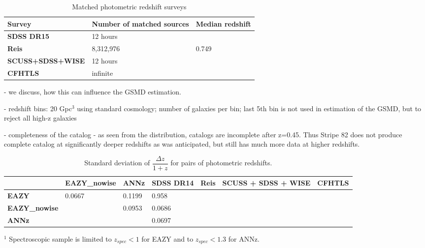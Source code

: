 \documentclass[apj,iop]{emulateapj}
\begin{document}
\begin{table}
    \caption{Matched photometric redshift surveys}
\begin{tabular}{|p{3.3cm}|p{2.4cm}|p{1.3cm}|}    
        \hline
        Survey                 & Number of matched sources & Median redshift    \\
        \hline
        \textbf{SDSS DR15}  & 12 hours & \\
        \textbf{Reis}     & 8,312,976  & 0.749    \\
        \textbf{SCUSS+SDSS+WISE} & 12 hours & \\
        \textbf{CFHTLS}         & infinite &\\
        \hline
    \end{tabular}
    \label{table:photoz_matched}
\end{table}

- we discuss, how this can influence the GSMD estimation.

- redshift bins: 20 Gpc$^3$ using standard cosmology; number of galaxies per bin; last 5th bin is not used in estimation of the GSMD, but to reject all high-z galaxies

- completeness of the catalog - as seen from the distribution, catalogs are incomplete after z=0.45. Thus Stripe 82 does not produce complete catalog at significantly deeper redshifts as was anticipated, but still has much more data at higher redshifts.


\begin{table}[t]
  \begin{center}
    \caption{Standard deviation of $\dfrac{\Delta z}{1+z}$ for pairs of photometric redshifts.}
    \begin{threeparttable}
    \begin{tabular}{|p{2.0cm}|p{2.0cm}|p{1.5cm}|p{2.0cm}|p{1.5cm}|p{1.5cm}|p{1.5cm}|}
      \toprule %
      \textbf{} &  \textbf{EAZY\_nowise} & \textbf{ANNz} & \textbf{SDSS DR14} & \textbf{Reis} & \textbf{SCUSS + SDSS + WISE} & \textbf{CFHTLS} \\
         \hline 
      \textbf{EAZY}  &   0.0667 & 0.1199 & 0.958 & & &\\
      \textbf{EAZY\_nowise}  &    & 0.0953 & 0.0686 & & & \\
      \textbf{ANNz} & &  &0.0697 & & &\\
   \hline 
    \end{tabular}
\begin{tablenotes}    
    \item[$^1$] Spectroscopic sample is limited to $z_{spec}<1$ for EAZY and to $z_{spec}<1.3$ for ANNz.
     \end{tablenotes}
         \label{tab:photoz_STD}
    \end{threeparttable}
  \end{center}
\end{table}
\end{document}
